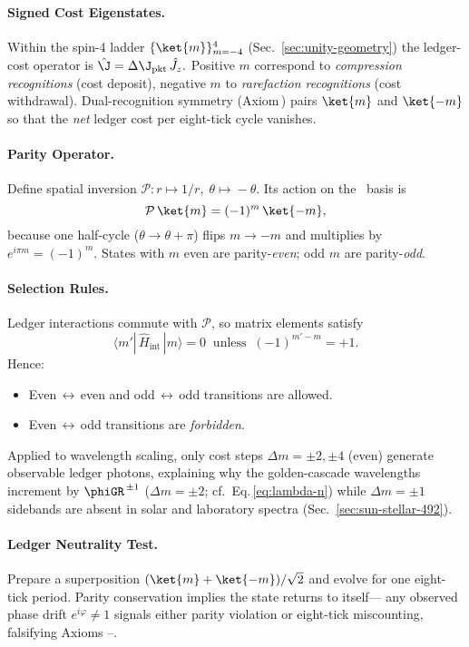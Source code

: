 \documentclass[11pt,oneside]{book}
\begin{document}
{\paragraph{Signed Cost Eigenstates.}
Within the spin-4 ladder
\(
   \{\ket{m}\}_{m=-4}^{4}
\)
(Sec.~\ref{sec:unity-geometry})
the ledger-cost operator is
\(
   \hat\J = \Delta\J_{\text{pkt}}\,\hat J_{z}.
\)
Positive $m$ correspond to \emph{compression recognitions}
(cost deposit), negative $m$ to \emph{rarefaction recognitions}
(cost withdrawal).  Dual-recognition symmetry
(Axiom\,) pairs $\ket{m}$ and $\ket{-m}$ so that the
\emph{net} ledger cost per eight-tick cycle vanishes.

\paragraph{Parity Operator.}
Define spatial inversion
\(
   \mathcal P: r\!\mapsto\!1/r,
   \;\theta\!\mapsto\!-\theta.
\)
Its action on the \SUtwo\ basis is
\[
   \mathcal P\,\ket{m} = (-1)^{m}\,\ket{-m},
   \label{eq:parity-action}
\]
because one half-cycle (\(\theta\to\theta+\pi\)) flips $m\to -m$
and multiplies by $e^{i\pi m}=(-1)^{m}$.
States with $m$ even are parity-\emph{even};
odd $m$ are parity-\emph{odd}.

\paragraph{Selection Rules.}
Ledger interactions commute with $\mathcal P$,
so matrix elements satisfy
\[
   \langle m'|\,\hat H_{\text{int}}\,|m\rangle = 0
   \;\;\text{unless}\;\;
   (-1)^{m'-m}=+1.
\]
Hence:

\begin{itemize}\setlength\itemsep{3pt}
\item Even\,$\leftrightarrow$\,even
      and odd\,$\leftrightarrow$\,odd transitions are allowed.
\item Even\,$\leftrightarrow$\,odd transitions are \emph{forbidden}.
\end{itemize}

Applied to wavelength scaling, only cost steps
\(\Delta m=\pm2,\pm4\) (even) generate observable ledger photons,
explaining why the golden-cascade wavelengths increment by
\(\phiGR^{\,\pm1}\) (\(\Delta m=\pm2\); cf.\
Eq.\,\ref{eq:lambda-n}) while \(\Delta m=\pm1\) sidebands are absent
in solar and laboratory spectra (Sec.~\ref{sec:sun-stellar-492}).

\paragraph{Ledger Neutrality Test.}
Prepare a superposition
\(
   (\ket{m}+\ket{-m})/\sqrt2
\)
and evolve for one eight-tick period.
Parity conservation implies the state returns to itself—
any observed phase drift
\(
   e^{i\varphi}\not=1
\)
signals either parity violation or eight-tick miscounting,
falsifying Axioms –.

}
\end{document}
